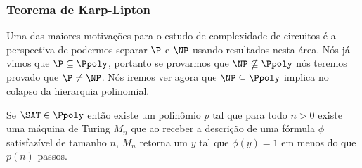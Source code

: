 \subsubsection{Teorema de Karp-Lipton}

Uma das maiores motivações para o estudo de complexidade de circuitos é a perspectiva de podermos separar $\P$ e $\NP$ usando resultados nesta área. Nós já vimos que $\P \subseteq \Ppoly$, portanto se provarmos que $\NP \nsubseteq \Ppoly$ nós teremos provado que $\P \neq \NP$. Nós iremos ver agora que $\NP \subseteq \Ppoly$ implica no colapso da hierarquia polinomial.

\begin{lema} \label{lema:SATppoly}

Se $\SAT \in \Ppoly$ então existe um polinômio $p$ tal que para todo $n > 0$ existe uma máquina de Turing $M_{n}$ que ao receber a descrição de uma fórmula $\phi$ satisfazível de tamanho $n$, $M_{n}$ retorna um $y$ tal que $\phi(y) = 1$ em menos do que $p(n)$ passos.

\end{lema}

